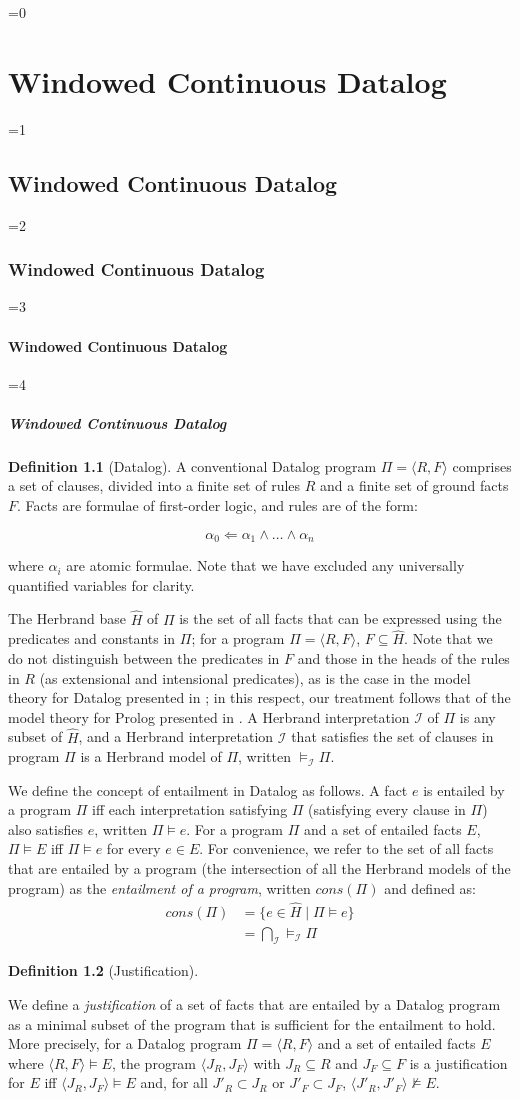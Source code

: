 \documentclass[twocolumn,preprint,3p,number]{elsarticle}
\theoremstyle{plain}
\theoremstyle{definition}
\newtheorem{definition}{Definition}
\newcounter{nestingdepth}
\newenvironment{nestedsection}[2]{
  \ifnum\value{nestingdepth}=0
    \chapter{#1}
  \else
    \ifnum\value{nestingdepth}=1
      \section{#1}
    \else
      \ifnum\value{nestingdepth}=2
        \subsection{#1}
      \else
        \ifnum\value{nestingdepth}=3
          \subsubsection{#1}
        \else
          \ifnum\value{nestingdepth}=4
            \paragraph{#1}
          \else
            \PackageError{nestedsections}{Maximum nesting level exceeded!}{uh oh!}
          \fi
        \fi
      \fi
    \fi
  \fi
  \addtocounter{nestingdepth}{1}
  \label{sec:#2}
}{\addtocounter{nestingdepth}{-1}}
\def\labeldef#1{\label{def:#1}}
\begin{document}
\begin{nestedsection}{Windowed Continuous Datalog}{semantics}
\begin{definition}[Datalog]
A conventional Datalog program $\Pi = \langle R, F\rangle$ comprises a
set of clauses, divided into a finite set of rules $R$ and a finite
set of ground facts $F$. Facts are formulae of first-order logic, and
rules are of the form:

\[ \alpha_0 \Leftarrow \alpha_1 \land \ldots \land \alpha_n \]

\noindent where $\alpha_i$ are atomic formulae. Note that we have excluded any
universally quantified variables for clarity.

The Herbrand base $\hat{H}$ of $\Pi$ is the set of all facts that can
be expressed using the predicates and constants in $\Pi$; for a program $\Pi =
\langle R, F \rangle$, $F \subseteq \hat{H}$. Note that we do not
distinguish between the predicates in $F$ and those in the heads of
the rules in $R$ (as extensional and intensional predicates), as is
the case in the model theory for Datalog presented in
\cite{datalog-basics}; in this respect, our treatment follows that of
the model theory for Prolog presented in \cite{prolog-semantics}. A
Herbrand interpretation $\mathcal{I}$ of $\Pi$ is any subset of
$\hat{H}$, and a Herbrand interpretation $\mathcal{I}$ that satisfies
the set of clauses in program $\Pi$ is a Herbrand model of $\Pi$,
written $\models_{\mathcal{I}} \Pi$.

We define the concept of entailment in Datalog as follows. A fact $e$
is entailed by a program $\Pi$ iff each interpretation satisfying
$\Pi$ (satisfying every clause in $\Pi$) also satisfies $e$, written
$\Pi \models e$. For a program $\Pi$ and a set of entailed facts
$E$, $\Pi \models E$ iff $\Pi \models e$ for every $e \in E$. For
convenience, we refer to the set of all facts that are entailed by a
program (the intersection of all the Herbrand models of the program)
as the {\em entailment of a program}, written $cons(\Pi)$ and defined
as:
\begin{align*}
  cons(\Pi) &= \{ e \in \hat{H} \mid \Pi \models e \} \\
  &= \bigcap_\mathcal{I} \models_\mathcal{I} \Pi
\end{align*}
\end{definition}

\begin{definition}[Justification]
\labeldef{continuous datalog: justification}

We define a {\em justification} of a set of facts that are entailed by
a Datalog program as a minimal subset of the program that is
sufficient for the entailment to hold. More precisely, for a Datalog
program $\Pi = \langle R, F \rangle$ and a set of entailed facts $E$
where $\langle R, F \rangle \models E$, the program $\langle J_R, J_F
\rangle$ with $J_R \subseteq R$ and $J_F \subseteq F$ is a
justification for $E$ iff $\langle J_R, J_F \rangle \models E$ and,
for all $J'_R \subset J_R$ or $J'_F \subset J_F$, $\langle J'_R, J'_F
\rangle \not\models E$.


\end{definition}
\end{nestedsection}
\end{document}

